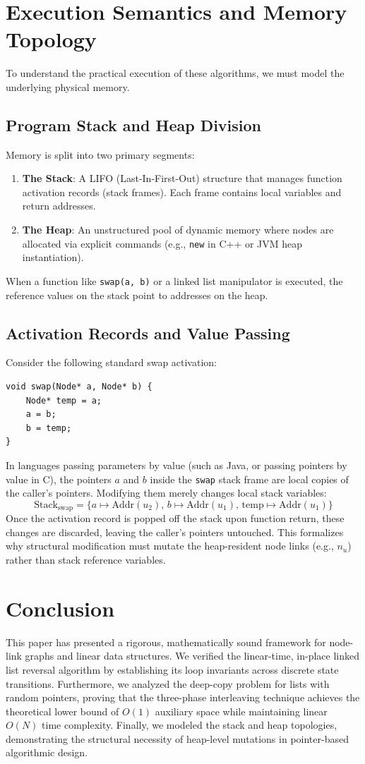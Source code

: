 \documentclass[10pt,journal,compsoc]{IEEEtran}
\begin{document}
\section{Execution Semantics and Memory Topology}
To understand the practical execution of these algorithms, we must model the underlying physical memory.

\subsection{Program Stack and Heap Division}
Memory is split into two primary segments:
\begin{enumerate}
\item \textbf{The Stack}: A LIFO (Last-In-First-Out) structure that manages function activation records (stack frames). Each frame contains local variables and return addresses.
\item \textbf{The Heap}: An unstructured pool of dynamic memory where nodes are allocated via explicit commands (e.g., \texttt{new} in C++ or JVM heap instantiation).
\end{enumerate}

When a function like \texttt{swap(a, b)} or a linked list manipulator is executed, the reference values on the stack point to addresses on the heap.

\subsection{Activation Records and Value Passing}
Consider the following standard swap activation:
\begin{verbatim}
void swap(Node* a, Node* b) {
    Node* temp = a;
    a = b;
    b = temp;
}
\end{verbatim}
In languages passing parameters by value (such as Java, or passing pointers by value in C), the pointers $a$ and $b$ inside the \texttt{swap} stack frame are local copies of the caller's pointers. Modifying them merely changes local stack variables:
\[ \text{Stack}_{\text{swap}} = \{ a \mapsto \text{Addr}(u_2), \, b \mapsto \text{Addr}(u_1), \, \text{temp} \mapsto \text{Addr}(u_1) \} \]
Once the activation record is popped off the stack upon function return, these changes are discarded, leaving the caller's pointers untouched. This formalizes why structural modification must mutate the heap-resident node links (e.g., $n_u$) rather than stack reference variables.

\section{Conclusion}
This paper has presented a rigorous, mathematically sound framework for node-link graphs and linear data structures. We verified the linear-time, in-place linked list reversal algorithm by establishing its loop invariants across discrete state transitions. Furthermore, we analyzed the deep-copy problem for lists with random pointers, proving that the three-phase interleaving technique achieves the theoretical lower bound of $O(1)$ auxiliary space while maintaining linear $O(N)$ time complexity. Finally, we modeled the stack and heap topologies, demonstrating the structural necessity of heap-level mutations in pointer-based algorithmic design.
\end{document}
